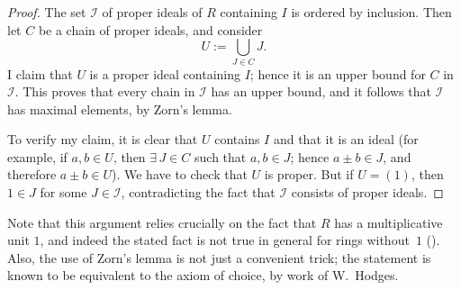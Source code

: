 \begin{proof}
  The set $\mathscr{I}$ of proper ideals of $R$ containing $I$ is
  ordered by inclusion. Then let $C$ be a chain of proper ideals, and
  consider
  \[U := \bigcup_{J \in C} J.\] I claim that $U$ is a proper ideal
  containing $I$; hence it is an upper bound for $C$ in
  $\mathscr{I}$. This proves that every chain in $\mathscr{I}$ has an
  upper bound, and it follows that $\mathscr{I}$ has maximal elements,
  by Zorn's lemma.

  To verify my claim, it is clear that $U$ contains $I$ and that it is
  an ideal (for example, if $a, b \in U$, then $\exists\, J \in C$
  such that $a, b \in J$; hence $a \pm b \in J$, and therefore
  $a \pm b \in U$). We have to check that $U$ is proper. But if
  $U = (1)$, then $1 \in J$ for some $J \in \mathscr{I}$,
  contradicting the fact that $\mathscr{I}$ consists of proper ideals.
\end{proof}

Note that this argument relies crucially on the fact that $R$ has a
multiplicative unit $1$, and indeed the stated fact is not true in
general for rings without~$1$
(). Also, the
use of Zorn's lemma is not just a convenient trick; the statement is
known to be equivalent to the axiom of choice, by work of W.~Hodges.

